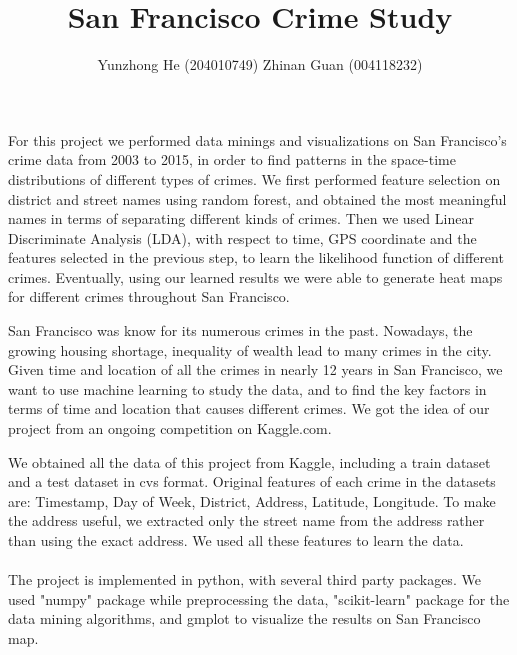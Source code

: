 \documentclass[12pt]{article}
\newenvironment{abs}[2][Abstract]{\begin{trivlist}
\item[\hskip \labelsep {\bfseries #1}\hskip \labelsep {\bfseries #2}]}{\end{trivlist}}
\newenvironment{p1}[2][Motivation]{\begin{trivlist}
\item[\hskip \labelsep {\bfseries #1}\hskip \labelsep {\bfseries #2}]}{\end{trivlist}}
\newenvironment{p2}[2][Data and Software Tools]{\begin{trivlist}
\item[\hskip \labelsep {\bfseries #1}\hskip \labelsep {\bfseries #2}]}{\end{trivlist}}
\begin{document}
 
 
\title{San Francisco Crime Study}
\author{Yunzhong He (204010749) Zhinan Guan (004118232)}
\maketitle

\begin{abs}{}
\item{}
For this project we performed data minings and visualizations on San Francisco's crime data from 2003 to 2015, in order to find patterns in the space-time distributions of different types of crimes. We first performed feature selection on district and street names using random forest, and obtained the most meaningful names in terms of separating different kinds of crimes. Then we used Linear Discriminate Analysis (LDA), with respect to time, GPS coordinate and the features selected in the previous step, to learn the likelihood function of different crimes. Eventually, using our learned results we were able to generate heat maps for different crimes throughout San Francisco.
\end{abs}

\begin{p1}{}
\item{}
San Francisco was know for its numerous crimes in the past. Nowadays, the growing housing shortage,  inequality of wealth lead to many crimes in the city. Given time and location of all the crimes in nearly 12 years in San Francisco, we want to use machine learning to study the data, and to find the key factors in terms of time and location that causes different crimes. We got the idea of our project from an ongoing competition on Kaggle.com. 
\end{p1}

\begin{p2}{}
\item{}
We obtained all the data of this project from Kaggle, including a train dataset and a test dataset in cvs format. Original features of each crime in the datasets are: Timestamp, Day of Week, District, Address, Latitude, Longitude. To make the address useful, we extracted only the street name from the address rather than using the exact address. We used all these features to learn the data.\\\\
The project is implemented in python, with several third party packages. We used "numpy" package while preprocessing the data, "scikit-learn" package for the data mining algorithms, and gmplot to visualize the results on San Francisco map. 
\end{p2}
\end{document}
